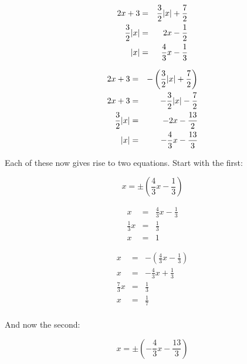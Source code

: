 \documentclass[letterpaper,12pt,fleqn]{article}
\begin{document}
\begin{enumerate}
  \begin{minipage}[t]{2.5in}
    \begin{eqnarray*}
      2x+3 &=& \frac{3}{2}\lvert x\rvert+\frac{7}{2} \\
      \frac{3}{2}\lvert x\rvert &=& 2x-\frac{1}{2} \\
      \lvert x\rvert &=& \frac{4}{3}x-\frac{1}{3} \\
    \end{eqnarray*}
  \end{minipage}
  \begin{minipage}[t]{2.5in}
    \begin{eqnarray*}
      2x+3 &=& -\left(\frac{3}{2}\lvert x\rvert+\frac{7}{2}\right) \\
      2x+3 &=& -\frac{3}{2}\lvert x\rvert-\frac{7}{2} \\
      \frac{3}{2}\lvert x\rvert &=& -2x-\frac{13}{2} \\
      \lvert x\rvert &=& -\frac{4}{3}x-\frac{13}{3} \\
    \end{eqnarray*}
  \end{minipage}

  Each of these now gives rise to two equations. Start with the first:

  \[x=\pm\left(\frac{4}{3}x-\frac{1}{3}\right)\]

  \begin{minipage}[t]{2.5in}
    \begin{eqnarray*}
      x &=& \frac{4}{3}x-\frac{1}{3} \\
      \frac{1}{3}x &=& \frac{1}{3} \\
      x &=& 1
    \end{eqnarray*}
  \end{minipage}
  \begin{minipage}[t]{2.5in}
    \begin{eqnarray*}
      x &=& -\left(\frac{4}{3}x-\frac{1}{3}\right) \\
      x &=& -\frac{4}{3}x+\frac{1}{3} \\
      \frac{7}{3}x &=& \frac{1}{3} \\
      x &=& \frac{1}{7} \\
    \end{eqnarray*}
  \end{minipage}

  And now the second:

  \[x=\pm\left(-\frac{4}{3}x-\frac{13}{3}\right)\]


\end{enumerate}
\end{document}
